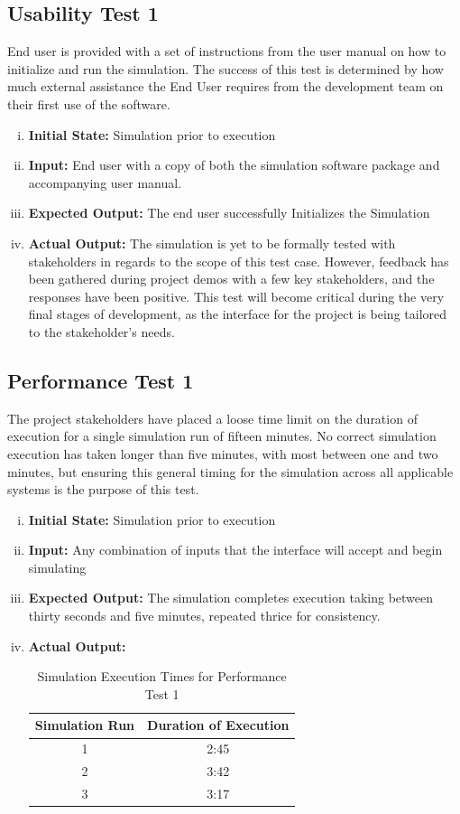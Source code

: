 \documentclass[paper=letter, fontsize=10pt]{scrartcl}
\numberwithin{equation}{section}		%
\numberwithin{figure}{section}			%
\numberwithin{table}{section}				%
\begin{document}
\subsection{Usability Test 1}
End user is provided with a set of instructions from the user manual on how to initialize and run the simulation. The success of this test is determined by how much external assistance the End User requires from the development team on their first use of the software. 
\begin{enumerate}[(i)]
	\item \textbf{Initial State:} Simulation prior to execution
	\item \textbf{Input:} End user with a copy of both the simulation software package and accompanying user manual.
	\item \textbf{Expected Output:} The end user successfully Initializes the Simulation
	\item \textbf{Actual Output:} The simulation is yet to be formally tested with stakeholders in regards to the scope of this test case. However, feedback has been gathered during project demos with a few key stakeholders, and the responses have been positive. This test will become critical during the very final stages of development, as the interface for the project is being tailored to the stakeholder's needs.
\end{enumerate}

\subsection{Performance Test 1}
The project stakeholders have placed a loose time limit on the duration of execution for a single simulation run of fifteen minutes. No correct simulation execution has taken longer than five minutes, with most between one and two minutes, but ensuring this general timing for the simulation across all applicable systems is the purpose of this test.
\begin{enumerate}[(i)]
	\item \textbf{Initial State:} Simulation prior to execution 
	\item \textbf{Input:} Any combination of inputs that the interface will accept and begin simulating
	\item \textbf{Expected Output:} The simulation completes execution taking between thirty seconds and five minutes, repeated thrice for consistency.
	\item \textbf{Actual Output:}
	\begin{table}
	\caption{Simulation Execution Times for Performance Test 1}
	\begin{center}
    	\begin{tabular}{| c | c |}
    		\hline
        	Simulation Run & Duration of Execution \\ \hline
  			1 & 2:45 \\ \hline
  			2 & 3:42 \\ \hline
  			3 & 3:17 \\ \hline
    	\end{tabular}
	\end{center}
	\end{table}
\end{enumerate}
\end{document}
